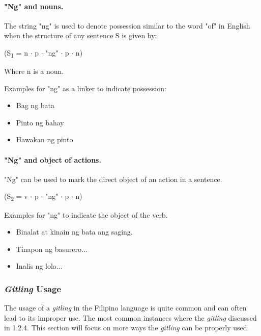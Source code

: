 \paragraph{"Ng" and nouns.} The string "ng" is used to denote possession similar to
the word "of" in English when the structure of any sentence S is given by:

\begin{center}
      (S\textsubscript{1} = n \(\cdot\) p \(\cdot\) "ng" \(\cdot\) p \(\cdot\) n)
\end{center}

Where n is a noun. \\

\begin{example}
      Examples for "ng" as a linker to indicate possession:
\end{example}
\begin{itemize}
      \item Bag ng bata
      \item Pinto ng bahay
      \item Hawakan ng pinto
\end{itemize}

\paragraph{"Ng" and object of actions.}"Ng" can be used to mark the direct object
of an action in a sentence.
\begin{center}
      (S\textsubscript{2} = v \(\cdot\) p \(\cdot\) "ng" \(\cdot\) p \(\cdot\) n)
\end{center}

\begin{example}
      Examples for "ng" to indicate the object of the verb.
\end{example}
\begin{itemize}
      \item Binalat at kinain ng bata ang saging.
      \item Tinapon ng basurero...
      \item Inalis ng lola...
\end{itemize}

\subsubsection{\textit{Gitling} Usage}
The usage of a \textit{gitling} in the Filipino language is quite common and can often lead to its improper use. The most common instances where the \textit{gitling} discussed in 1.2.4. This section will focus on more ways the \textit{gitling} can be properly used.

